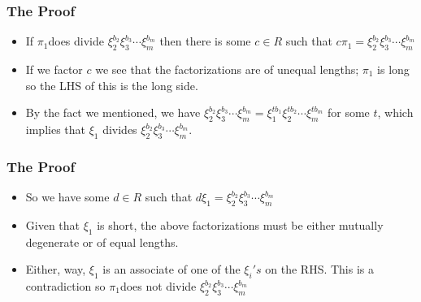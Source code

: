 \begin{frame}
  \frametitle{The Proof}
  \begin{itemize}
    \item If $\pi_{1}$does divide $\xi_{2}^{b_{2}}\xi_{3}^{b_{3}}\cdots\xi_{m}^{b_{m}}$
      then there is some $c\in R$ such that $c\pi_{1}=\xi_{2}^{b_{2}}\xi_{3}^{b_{3}}\cdots\xi_{m}^{b_{m}}$
  \end{itemize}

  \pause{}
  \begin{itemize}
    \item If we factor $c$ we see that the factorizations are of unequal lengths;
      $\pi_{1}$ is long so the LHS of this is the long side.
  \end{itemize}

  \pause{}
  \begin{itemize}
    \item By the fact we mentioned, we have $\xi_{2}^{b_{2}}\xi_{3}^{b_{3}}\cdots\xi_{m}^{b_{m}}=\xi_{1}^{tb_{1}}\xi_{2}^{tb_{2}}\cdots\xi_{m}^{tb_{m}}$
      for some $t$, which implies that $\xi_{1}$ divides $\xi_{2}^{b_{2}}\xi_{3}^{b_{3}}\cdots\xi_{m}^{b_{m}}$.
  \end{itemize}
\end{frame}

\begin{frame}
  \frametitle{The Proof}
  \begin{itemize}
    \item So we have some $d\in R$ such that $d\xi_{1}=\xi_{2}^{b_{2}}\xi_{3}^{b_{3}}\cdots\xi_{m}^{b_{m}}$
  \end{itemize}

  \pause{}
  \begin{itemize}
    \item Given that $\xi_{1}$ is short, the above factorizations must be either
      mutually degenerate or of equal lengths.
  \end{itemize}

  \pause{}
  \begin{itemize}
    \item Either, way, $\xi_{1}$ is an associate of one of the $\xi_{i}'s$
      on the RHS. This is a contradiction so $\pi_{1}$does not divide $\xi_{2}^{b_{2}}\xi_{3}^{b_{3}}\cdots\xi_{m}^{b_{m}}$
  \end{itemize}
\end{frame}

